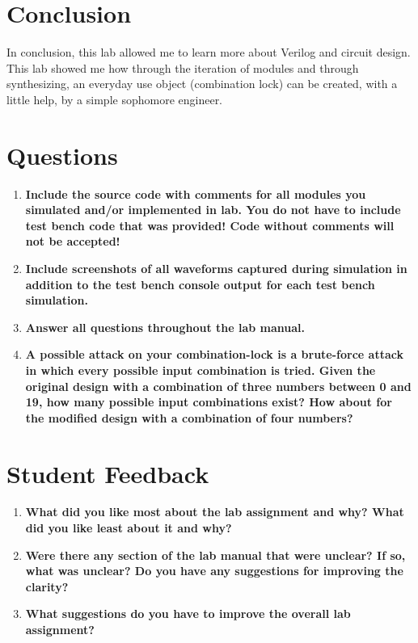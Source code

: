 \documentclass[a4paper,12pt]{article}
\begin{document}
\section*{Conclusion}

  \hspace{15pt}In conclusion, this lab allowed me to learn more about Verilog and circuit design. This lab showed me how through the iteration of modules and through synthesizing, an everyday use object (combination lock) can be created, with a little help, by a simple sophomore engineer.


\section*{Questions}

\begin{enumerate}
  \item \textbf{Include the source code with comments for all modules you simulated and/or implemented in lab. You do not have to include test bench code that was provided! Code without comments will not be
accepted!}

  \item \textbf{Include screenshots of all waveforms captured during simulation in addition to the test bench console output for each test bench simulation.}

  \item \textbf{Answer all questions throughout the lab manual.}
  
  \item \textbf{A possible attack on your combination-lock is a brute-force attack in which every possible input combination is tried. Given the original design with a combination of three numbers between 0 and 19, how many possible input combinations exist? How about for the modified design with a combination of four numbers?}
\end{enumerate}

\section*{Student Feedback}

\begin{enumerate}
  \item \textbf{What did you like most about the lab assignment and why? What did you like least about it and why?}
  \vspace{10pt}

  \item \textbf{Were there any section of the lab manual that were unclear? If so, what was unclear? Do you have any suggestions for improving the clarity?}
  \vspace{10pt}

  \item \textbf{What suggestions do you have to improve the overall lab assignment?}
  \vspace{10pt}

\end{enumerate}
\end{document}
